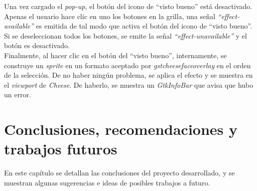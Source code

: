 \documentclass[a4paper,openright,12pt]{report}
\begin{document}
Una vez cargado el \textit{pop-up}, el botón del icono de ``visto bueno'' está
desactivado. Apenas el usuario hace clic en uno los botones en la grilla, una
señal \textit{``effect-available''} es emitida de tal modo que activa el botón
del icono de ``visto bueno''. Si se deseleccionan todos los botones, se emite la
señal \textit{``effect-unavailable''} y el botón es desactivado.\\

Finalmente, al hacer clic en el botón del ``visto bueno'', internamente,
se construye un \textit{sprite} en un formato aceptado por
\textit{gstcheesefaceoverlay} en el orden de la selección. De no haber ningún
problema, se aplica el efecto y se muestra en el \textit{viewport} de \textit{Cheese}.
De haberlo, se muestra un \textit{GtkInfoBar} que avisa que hubo un error.


\chapter{Conclusiones, recomendaciones y trabajos futuros}
En este capítulo se detallan las conclusiones del proyecto desarrollado, y se
muestran algunas sugerencias e ideas de posibles trabajos a futuro.
\end{document}
